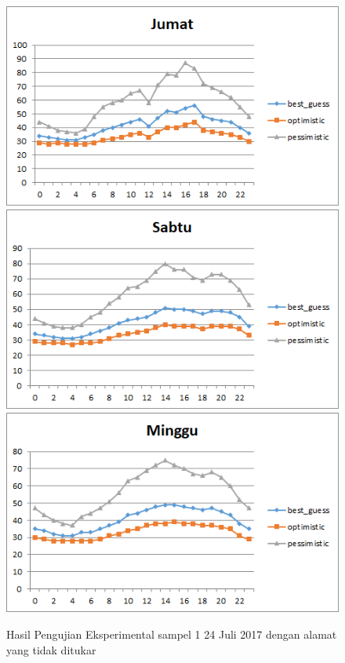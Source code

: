 \begin{figure}[H]
				\centering		
				\includegraphics[]{Gambar/jumatsampel124072017normal.png}
				\includegraphics[]{Gambar/sabtusampel124072017normal.png}
				\includegraphics[]{Gambar/minggusampel124072017normal.png}
				\caption[Hasil Pengujian Eksperimental]{Hasil Pengujian Eksperimental sampel 1 24 Juli 2017 dengan alamat yang tidak ditukar}
				\label{fig:eksperimentalsampel2124072017normal}
\end{figure}

